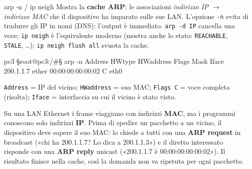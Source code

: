 \begin{scheda}{arp -n \quad / \quad ip neigh}
 \quad {} \quad {} \quad {}
Mostra la \textbf{cache ARP}: le associazioni \emph{indirizzo IP $\to$ indirizzo MAC} che il dispositivo ha imparato sulle sue LAN. L'opzione \texttt{-n} evita di tradurre gli IP in nomi (DNS): l'output è immediato. \texttt{arp -d IP} cancella una voce; \texttt{ip neigh} è l'equivalente moderno (mostra anche lo stato: \texttt{REACHABLE}, \texttt{STALE}, \dots); \texttt{ip neigh flush all} svuota la cache.
\begin{terminale}{pc3}
§root@pc3:/#§ arp -n
Address        HWtype  HWaddress          Flags Mask  Iface
200.1.1.7      ether   00:00:00:00:00:02  C           eth0
\end{terminale}
\texttt{Address} = IP del vicino; \texttt{HWaddress} = suo MAC; \texttt{Flags C} = voce completa (risolta); \texttt{Iface} = interfaccia su cui il vicino è stato visto.
\end{scheda}
\begin{intuizione}
Su una LAN Ethernet i frame viaggiano con indirizzi \textbf{MAC}, ma i programmi conoscono solo indirizzi \textbf{IP}. Prima di spedire un pacchetto a un vicino, il dispositivo deve sapere il suo MAC: lo chiede a tutti con una \textbf{ARP request} in broadcast («chi ha 200.1.1.7? Lo dica a 200.1.1.3») e il diretto interessato risponde con una \textbf{ARP reply} unicast («200.1.1.7 è 00:00:00:00:00:02»). Il risultato finisce nella cache, così la domanda non va ripetuta per ogni pacchetto.
\end{intuizione}

